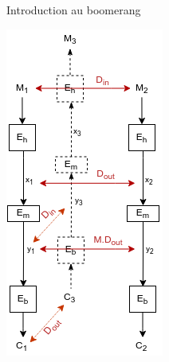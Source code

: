 \begin{frame}{Introduction au boomerang }
{\begin{center}
            \includegraphics[scale=0.5]{img/crypto/jafar/auto/boomerang-3.png}
        \end{center}
    }
\end{frame}
